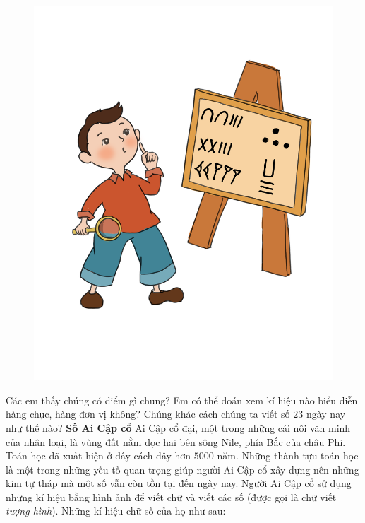 		\begin{figure}
		\centering
		\vspace*{-10pt}
		\captionsetup{labelformat= empty, justification=centering}
		\includegraphics[width=1\linewidth]{20.12-pi}
		\vspace*{-30pt}
	\end{figure}
	Các em thấy chúng có điểm gì chung? Em có thể đoán xem kí hiệu nào biểu diễn hàng chục, hàng đơn vị không? Chúng khác cách chúng ta viết số $23$ ngày nay như thế nào?
	\vskip 0.1cm
	\textbf{\color{toancuabi}Số Ai Cập cổ}
	\vskip 0.1cm
	Ai Cập cổ đại, một trong những cái nôi văn minh của nhân loại, là vùng đất nằm dọc hai bên sông Nile, phía Bắc của châu Phi. Toán học đã xuất hiện ở đây cách đây hơn $5000$ năm. Những thành tựu toán học là một trong những yếu tố quan trọng giúp người Ai Cập cổ xây dựng nên những kim tự tháp mà một số vẫn còn tồn tại đến ngày nay. 
	\vskip 0.1cm
	Người Ai Cập cổ sử dụng những kí hiệu bằng hình ảnh để viết chữ và viết các số (được gọi là chữ viết \textit{tượng hình}). Những kí hiệu chữ số của họ như sau:

